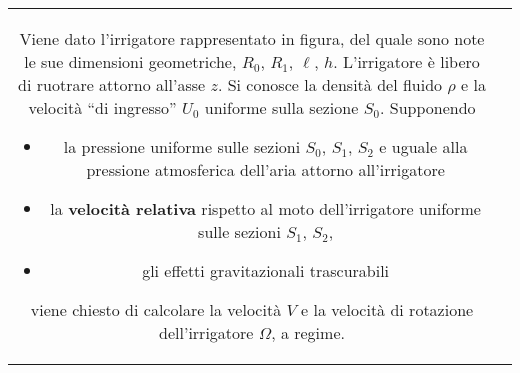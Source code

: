\noindent
\begin{tabular}{cc}
\begin{minipage}{0.95\textwidth}
\begin{exerciseS}
Viene dato l'irrigatore rappresentato in figura, del quale sono note le sue dimensioni geometriche, $R_0$, $R_1$, $\ell$, $h$. L'irrigatore è libero di ruotrare attorno all'asse $z$. Si conosce la densità del fluido $\rho$ e la velocità ``di ingresso'' $U_0$ uniforme sulla sezione $S_0$. Supponendo
\begin{itemize}
 \item la pressione uniforme sulle sezioni $S_0$, $S_1$, $S_2$ e uguale alla pressione atmosferica dell'aria attorno all'irrigatore
 \item la \textbf{velocità relativa} rispetto al moto dell'irrigatore uniforme sulle sezioni $S_1$, $S_2$,
 \item gli effetti gravitazionali trascurabili
\end{itemize}
 viene chiesto di calcolare la velocità $V$ e la velocità di rotazione dell'irrigatore $\Omega$, a regime.
\end{exerciseS}
\end{minipage}
\end{tabular}

\sol

\partone

